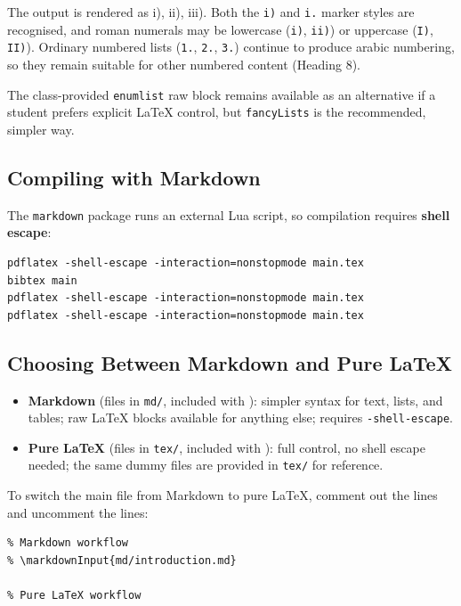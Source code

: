 The output is rendered as i), ii), iii). Both the \texttt{i)} and \texttt{i.} marker styles are recognised, and roman numerals may be lowercase (\texttt{i)}, \texttt{ii)}) or uppercase (\texttt{I)}, \texttt{II)}). Ordinary numbered lists (\texttt{1.}, \texttt{2.}, \texttt{3.}) continue to produce arabic numbering, so they remain suitable for other numbered content (Heading 8).

The class-provided \texttt{enumlist} raw block remains available as an alternative if a student prefers explicit \LaTeX{} control, but \texttt{fancyLists} is the recommended, simpler way.

\subsection{Compiling with Markdown}

The \texttt{markdown} package runs an external Lua script, so compilation requires \textbf{shell escape}:

\begin{verbatim}
pdflatex -shell-escape -interaction=nonstopmode main.tex
bibtex main
pdflatex -shell-escape -interaction=nonstopmode main.tex
pdflatex -shell-escape -interaction=nonstopmode main.tex
\end{verbatim}

\subsection{Choosing Between Markdown and Pure \LaTeX{}}

\begin{itemize}
    \item \textbf{Markdown} (files in \texttt{md/}, included with \texttt{\string\markdownInput}): simpler syntax for text, lists, and tables; raw \LaTeX{} blocks available for anything else; requires \texttt{-shell-escape}.
    \item \textbf{Pure \LaTeX{}} (files in \texttt{tex/}, included with \texttt{\string}): full control, no shell escape needed; the same dummy files are provided in \texttt{tex/} for reference.
\end{itemize}

To switch the main file from Markdown to pure \LaTeX{}, comment out the \texttt{\string\markdownInput} lines and uncomment the \texttt{\string} lines:

\begin{verbatim}
% Markdown workflow
% \markdownInput{md/introduction.md}

% Pure LaTeX workflow

\end{verbatim}

